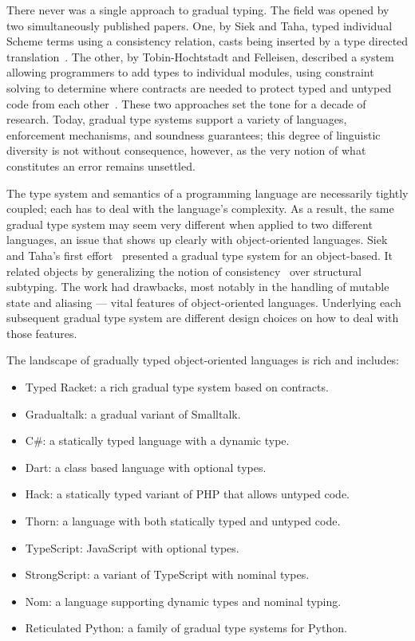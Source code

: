 \documentclass[USenglish]{tex/lipics-v2016}
\begin{document}
\vspace{-7mm}\noindent There never was a single approach to gradual
typing. The field was opened by two simultaneously published papers. One, by
Siek and Taha, typed individual Scheme terms using a consistency relation,
casts being inserted by a type directed translation~\cite{SiekTaha06}. 
The other, by
Tobin-Hochtstadt and Felleisen, described a system allowing programmers to
add types to individual modules, using constraint solving to determine where
contracts are needed to protect typed and untyped code from each other~\cite{tf-dls06}.  These two approaches set
the tone for a decade of research.  Today, gradual type systems support a
variety of languages, enforcement mechanisms, and soundness guarantees; this
degree of linguistic diversity is not without consequence, however, as the
very notion of what constitutes an error remains unsettled.

The type system and semantics of a programming language are necessarily
tightly coupled; each has to deal with the language's complexity. As a
result, the same gradual type system may seem very different when applied to
two different languages, an issue that shows up clearly with object-oriented
languages. Siek and Taha's first effort~\cite{SiekTaha07} presented a
gradual type system for an object-based. It related objects by generalizing
the notion of consistency~\cite{SiekTaha06} over structural subtyping. The
work had drawbacks, most notably in the handling of mutable state and
aliasing --- vital features of object-oriented languages.  Underlying each
subsequent gradual type system are different design choices on how to deal
with those features.

The landscape of gradually typed object-oriented languages is rich and includes:

\vspace{-2mm}
\begin{itemize}
 \item Typed Racket: a rich gradual type system based on contracts.
 \item Gradualtalk: a gradual variant of Smalltalk.
 \item C\#: a statically typed language with a dynamic type.
 \item Dart: a class based language with optional types.
 \item Hack: a statically typed variant of PHP that allows untyped code.
 \item Thorn: a language with both statically typed and untyped code.
 \item TypeScript: JavaScript with optional types.
 \item StrongScript: a variant of TypeScript with nominal types.
 \item Nom: a language supporting dynamic types and nominal typing.
 \item Reticulated Python: a family of gradual type systems for Python.
\end{itemize}
\end{document}
